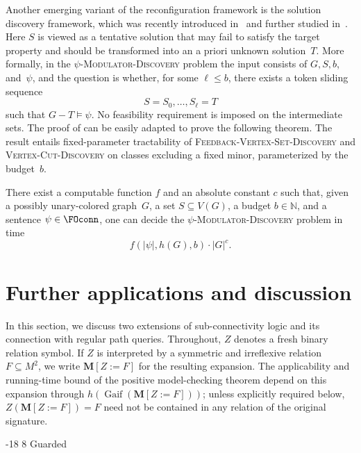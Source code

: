 \documentclass[1p,number,11pt]{elsarticle}
\makeatletter
\renewcommand\subsection{\@startsection{subsection}{2}{\z@}%
  {-18\p@ \@plus -4\p@ \@minus -4\p@}%
  {8\p@ \@plus 4\p@ \@minus 4\p@}%
  {\normalfont\normalsize\bfseries}}
\newcommand{\GFOscon}{\textup{Guarded}\raisebox{0.4pt}{\texttt{-}}\FOscon}
\newcommand{\N}{\mathbb{N}}
\newcommand{\Gaif}{\operatorname{Gaif}}
\theoremstyle{plain}
\renewcommand{\leq}{\leqslant}
\makeatother
\begin{document}
Another emerging variant of the reconfiguration framework is the solution
discovery framework, which was recently introduced
in~\cite{fellows2025onsd} and further studied
in~\cite{bousquet2025algorithmic,GroblerMMMRSS24,GroblerMMNRS24,saito2026solution,von2026separating}.
Here $S$ is viewed as a tentative solution that may fail to satisfy the target
property and should be transformed into an a priori unknown solution~$T$.
More formally, in the \textsc{$\psi$-Modulator-Discovery} problem the input
consists of $G,S,b$, and~$\psi$, and the question is whether, for some
$\ell\leq b$, there exists a token sliding sequence
\[
    S=S_0,\ldots,S_\ell=T
\]
such that $G-T\models\psi$. No feasibility requirement is imposed on the
intermediate sets. The proof of  can be easily adapted to prove the following theorem. The result entails fixed-parameter tractability of
\textsc{Feedback-Vertex-Set-Discovery} and
\textsc{Vertex-Cut-Discovery} on classes excluding a fixed minor,
parameterized by the budget~$b$.

\begin{theorem}[store=thm:modulatordiscovery,restate-keys={note=see \zcpageref[nocap]{thm:modulatordiscovery}}]
There exist a computable function $f$ and an absolute constant $c$ such
that, given a possibly unary-colored graph~$G$, a set $S\subseteq V(G)$, a
budget $b\in\N$, and a sentence $\psi\in\FOconn$, one can decide the
\textsc{$\psi$-Modulator-Discovery} problem in time
\[
    f(|\psi|,h(G),b)\cdot |G|^c.
\]
\end{theorem}

\section{Further applications and discussion}

In this section, we discuss two extensions of sub-connectivity logic and its
connection with regular path queries. Throughout, $Z$ denotes a fresh binary
relation symbol. If $Z$ is interpreted by a symmetric and irreflexive
relation $F\subseteq M^2$, we write $\mathbf M[Z:=F]$ for the resulting
expansion. The applicability and running-time bound of the positive
model-checking theorem depend on this expansion through
$h(\Gaif(\mathbf M[Z:=F]))$; unless explicitly required below,
$Z(\mathbf M[Z:=F])=F$ need not be contained in any relation of the original
signature.


\subsection{\texorpdfstring{\GFOscon}{Guarded-FO+subconn}}\label{subsec-guarded-fragment}
\end{document}
